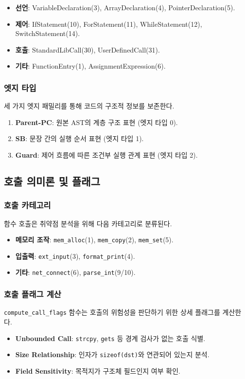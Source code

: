 \begin{itemize}
    \item \textbf{선언}: VariableDeclaration(3), ArrayDeclaration(4), PointerDeclaration(5).
    \item \textbf{제어}: IfStatement(10), ForStatement(11), WhileStatement(12), SwitchStatement(14).
    \item \textbf{호출}: StandardLibCall(30), UserDefinedCall(31).
    \item \textbf{기타}: FunctionEntry(1), AssignmentExpression(6).
\end{itemize}

\subsubsection{엣지 타입}
세 가지 엣지 패밀리를 통해 코드의 구조적 정보를 보존한다.

\begin{enumerate}
    \item \textbf{Parent-PC}: 원본 AST의 계층 구조 표현 (엣지 타입 0).
    \item \textbf{SB}: 문장 간의 실행 순서 표현 (엣지 타입 1).
    \item \textbf{Guard}: 제어 흐름에 따른 조건부 실행 관계 표현 (엣지 타입 2).
\end{enumerate}

\subsection{호출 의미론 및 플래그}

\subsubsection{호출 카테고리}
함수 호출은 취약점 분석을 위해 다음 카테고리로 분류된다.
\begin{itemize}
    \item \textbf{메모리 조작}: \texttt{mem\_alloc}(1), \texttt{mem\_copy}(2), \texttt{mem\_set}(5).
    \item \textbf{입출력}: \texttt{ext\_input}(3), \texttt{format\_print}(4).
    \item \textbf{기타}: \texttt{net\_connect}(6), \texttt{parse\_int}(9/10).
\end{itemize}

\subsubsection{호출 플래그 계산}
\texttt{compute\_call\_flags} 함수는 호출의 위험성을 판단하기 위한 상세 플래그를 계산한다.
\begin{itemize}
    \item \textbf{Unbounded Call}: \texttt{strcpy}, \texttt{gets} 등 경계 검사가 없는 호출 식별.
    \item \textbf{Size Relationship}: 인자가 \texttt{sizeof(dst)}와 연관되어 있는지 분석.
    \item \textbf{Field Sensitivity}: 목적지가 구조체 필드인지 여부 확인.
\end{itemize}
